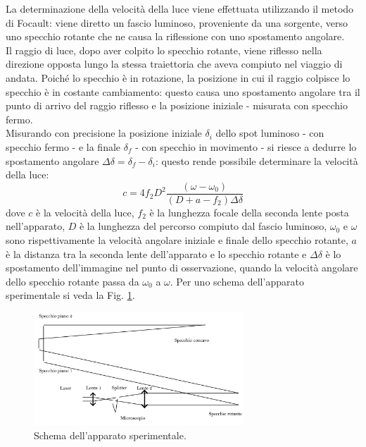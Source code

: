 \documentclass[]{article}
\begin{document}
    La determinazione della velocità della luce viene effettuata utilizzando il metodo di Focault: 
    viene diretto un fascio luminoso, proveniente da una sorgente, verso uno specchio rotante che ne causa la riflessione con uno spostamento angolare.\\
    Il raggio di luce, dopo aver colpito lo specchio rotante, viene riflesso nella direzione opposta lungo la stessa traiettoria che aveva compiuto nel viaggio di andata. Poiché lo specchio è in rotazione, la posizione in cui il raggio colpisce lo specchio è in costante cambiamento: questo causa uno spostamento angolare tra il punto di arrivo del raggio riflesso e la posizione iniziale - misurata con specchio fermo.\\
    Misurando con precisione la posizione iniziale $ \delta _i $ dello spot luminoso - con specchio fermo - e la finale  $ \delta _f $ - con specchio in movimento - si riesce a dedurre lo spostamento angolare $ \Delta \delta = \delta_f - \delta_i $: questo rende possibile determinare la velocità della luce:
    \begin{equation}
        \label{eqn-c}
        c=4 f_2 D^2 \frac{(\omega -\omega_0)}{(D+a-f_2)\Delta \delta }
    \end{equation}
    dove $ c $ è la velocità della luce, $ f_2 $ è la lunghezza focale della seconda lente posta nell'apparato, $ D $ è la lunghezza del percorso compiuto dal fascio luminoso, $ \omega_0 $ e $ \omega $ sono rispettivamente la velocità angolare iniziale e finale dello specchio rotante, $ a $ è la distanza tra la seconda lente dell'apparato e lo specchio rotante e $ \Delta\delta$ è lo spostamento dell'immagine nel punto di osservazione, quando la velocità angolare dello specchio rotante passa da $ \omega_0 $ a $ \omega $.
    Per uno schema dell'apparato sperimentale si veda la Fig. \ref{schema}.
    \begin{figure}[h]
        \centering
        \includegraphics[width=0.70\textwidth]{disegnetto-apparato.png}
        \caption{Schema dell'apparato sperimentale.}
        \label{schema}
    \end{figure}
\end{document}
